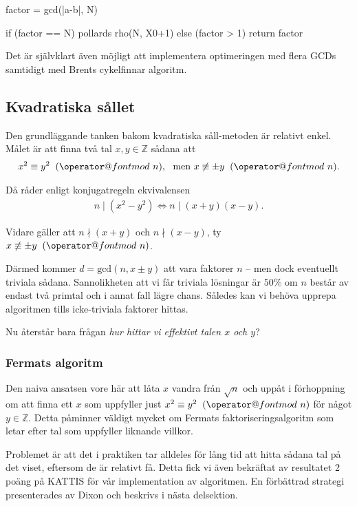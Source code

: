 \documentclass[a4paper,12pt]{article}
\makeatletter
\def\imod#1{\allowbreak\mkern10mu({\operator@font mod}\,\,#1)}
\renewcommand{\*}{\ensuremath{\cdot}}
\makeatother
\begin{document}
    factor = gcd(|a-b|, N)
    
    if (factor == N)
        pollards rho(N, X0+1)
    else (factor > 1)
        return factor

Det är självklart även möjligt att implementera optimeringen med flera GCDs samtidigt med Brents cykelfinnar algoritm.


\subsection{Kvadratiska sållet}

Den grundläggande tanken bakom kvadratiska såll-metoden är relativt enkel. Målet
är att finna två tal $x, y \in \mathbb{Z}$ sådana att
\begin{align*}
    x^2 \equiv y^2 \imod{n}, \ \text{ men } x \not\equiv \pm y \imod{n}.
\end{align*}

Då råder enligt konjugatregeln ekvivalensen
\begin{align*}
    n \mid (x^2 - y^2) \Leftrightarrow n \mid (x+y)(x-y).
\end{align*}

Vidare gäller att $n \nmid (x+y)$ och $n \nmid (x-y)$, ty $x \not\equiv \pm y
\imod{n}$. 

Därmed kommer $d = \text{gcd}\left( n, x \pm y \right)$ att vara faktorer  $n$
-- men dock eventuellt triviala sådana. Sannolikheten att vi får triviala
lösningar är $50 \%$ om $n$ består av endast två primtal och i annat fall lägre
chans. Således kan vi behöva upprepa algoritmen tills icke-triviala faktorer
hittas.

Nu återstår bara frågan \emph{hur hittar vi effektivt talen $x$ och $y$}?

\subsubsection{Fermats algoritm}

Den naiva ansatsen vore här att låta $x$ vandra från $\sqrt{n}$ och uppåt i
förhoppning om att finna ett $x$ som uppfyller just $x^2 \equiv y^2 \imod{n}$
för något $y \in \mathbb{Z}$. Detta påminner väldigt mycket om Fermats
faktoriseringsalgoritm som letar efter tal som uppfyller liknande villkor.

Problemet är att det i praktiken tar alldeles för lång tid att hitta sådana tal
på det viset, eftersom de är relativt få. Detta fick vi även bekräftat av
resultatet 2 poäng på KATTIS för vår implementation av algoritmen. En förbättrad
strategi presenterades av Dixon och beskrivs i nästa delsektion.
\end{document}
